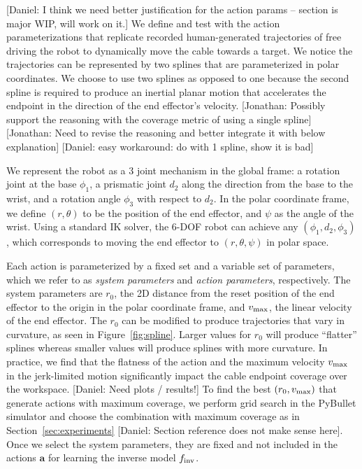 \documentclass[letterpaper, 10 pt, conference]{ieeeconf}  %
\newcommand{\ba}{\mathbf{a}}
\newcommand{\vmax}{v_{\rm max}}
\newcommand{\remark}[3]{{\color{#2}[#1: #3]}}
\newcommand{\daniel}[1]{\remark{Daniel}{blue}{#1}}
\newcommand{\jonathan}[1]{\remark{Jonathan}{cyan}{#1}}
\begin{document}
\daniel{I think we need better justification for the action params -- section is major WIP, will work on it.} We define and test with the action parameterizations that replicate recorded human-generated trajectories of free driving the robot to dynamically move the cable towards a target. We notice the trajectories can be represented by two splines that are parameterized in polar coordinates. We choose to use two splines as opposed to one because the second spline is required to produce an inertial planar motion that accelerates the endpoint in the direction of the end effector's velocity. \jonathan{Possibly support the reasoning with the coverage metric of using a single spline} \jonathan{Need to revise the reasoning and better integrate it with below explanation} \daniel{easy workaround: do with 1 spline, show it is bad}

We represent the robot as a 3 joint mechanism in the global frame: a rotation joint at the base $\phi_1$, a prismatic joint $d_2$ along the direction from the base to the wrist, and a rotation angle $\phi_3$ with respect to $d_2$. In the polar coordinate frame, we define $(r, \theta)$ to be the position of the end effector, and $\psi$ as the angle of the wrist. Using a standard IK solver, the 6-DOF robot can achieve any $(\phi_1, d_2, \phi_3)$, which corresponds to moving the end effector to $(r, \theta, \psi)$ in polar space.


Each action is parameterized by a fixed set and a variable set of parameters, which we refer to as \emph{system parameters} and \emph{action parameters}, respectively. The system parameters are $r_0$, the 2D distance from the reset position of the end effector to the origin in the polar coordinate frame, and $\vmax$, the linear velocity of the end effector. The $r_0$ can be modified to produce trajectories that vary in curvature, as seen in Figure~\ref{fig:spline}. Larger values for $r_0$ will produce ``flatter'' splines whereas smaller values will produce splines with more curvature. In practice, we find that the flatness of the action and the maximum velocity $\vmax$ in the jerk-limited motion significantly impact the cable endpoint coverage over the workspace. \daniel{Need plots / results!} To find the best $(r_0, \vmax)$ that generate actions with maximum coverage, we perform grid search in the PyBullet simulator and choose the combination with maximum coverage as in Section~\ref{sec:experiments} \daniel{Section reference does not make sense here}. Once we select the system parameters, they are fixed and not included in the actions $\ba$ for learning the inverse model $f_{\rm inv}$.
\end{document}
